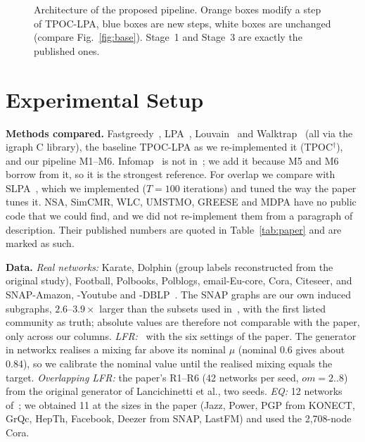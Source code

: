 \documentclass[conference]{IEEEtran}
\begin{document}
\begin{figure}[t]
\caption{Architecture of the proposed pipeline. Orange boxes modify a step of TPOC-LPA, blue boxes are new steps, white boxes are unchanged (compare Fig.~\ref{fig:base}). Stage~1 and Stage~3 are exactly the published ones.}
\label{fig:ours}
\end{figure}

\section{Experimental Setup}\label{sec:setup}
\textbf{Methods compared.} Fastgreedy~\cite{clauset2004}, LPA~\cite{raghavan2007}, Louvain~\cite{blondel2008} and Walktrap~\cite{pons2006} (all via the igraph C library), the baseline TPOC-LPA as we re-implemented it (TPOC$^{\dagger}$), and our pipeline M1--M6. Infomap~\cite{rosvall2008} is not in~\cite{kong2026}; we add it because M5 and M6 borrow from it, so it is the strongest reference. For overlap we compare with SLPA~\cite{xie2011}, which we implemented ($T{=}100$ iterations) and tuned the way the paper tunes it. NSA, SimCMR, WLC, UMSTMO, GREESE and MDPA have no public code that we could find, and we did not re-implement them from a paragraph of description. Their published numbers are quoted in Table~\ref{tab:paper} and are marked as such.

\textbf{Data.} \emph{Real networks:} Karate, Dolphin (group labels reconstructed from the original study), Football, Polbooks, Polblogs, email-Eu-core, Cora, Citeseer, and SNAP-Amazon, -Youtube and -DBLP~\cite{yang2012}. The SNAP graphs are our own induced subgraphs, $2.6$--$3.9\times$ larger than the subsets used in~\cite{kong2026}, with the first listed community as truth; absolute values are therefore not comparable with the paper, only across our columns. \emph{LFR:}~\cite{lfr2008} with the six settings of the paper. The generator in networkx realises a mixing far above its nominal $\mu$ (nominal 0.6 gives about 0.84), so we calibrate the nominal value until the realised mixing equals the target. \emph{Overlapping LFR:} the paper's R1--R6 (42 networks per seed, $om=2..8$) from the original generator of Lancichinetti et al., two seeds. \emph{EQ:} 12 networks of~\cite{kong2026}; we obtained 11 at the sizes in the paper (Jazz, Power, PGP from KONECT, GrQc, HepTh, Facebook, Deezer from SNAP, LastFM) and used the 2{,}708-node Cora.
\end{document}
